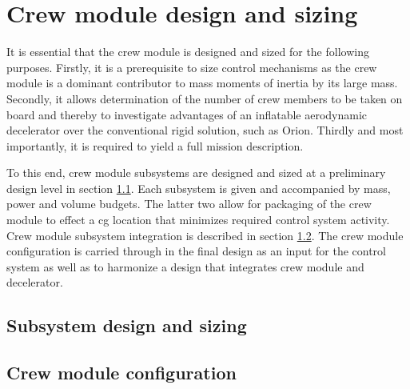 \section{Crew module design and sizing}\label{ch:crewmod}
It is essential that the crew module is designed and sized for the following purposes. Firstly, it is a prerequisite to size control mechanisms as the crew module is a dominant contributor to mass moments of inertia by its large mass. Secondly, it allows determination of the number of crew members to be taken on board and thereby to investigate advantages of an inflatable aerodynamic decelerator over the conventional rigid solution, such as Orion. Thirdly and most importantly, it is required to yield a full mission description.

To this end, crew module subsystems are designed and sized at a preliminary design level in section \ref{sec:crewsubsys}. Each subsystem is given and accompanied by mass, power and volume budgets. The latter two allow for packaging of the crew module to effect a \gls{cg} location that minimizes required control system activity. Crew module subsystem integration is described in section \ref{sec:crewpackaging}. The crew module configuration is carried through in the final design as an input for the control system as well as to harmonize a design that integrates crew module and decelerator.

\subsection{Subsystem design and sizing} \label{sec:crewsubsys}


\subsection{Crew module configuration} \label{sec:crewpackaging}



